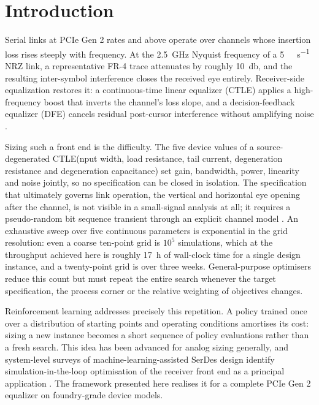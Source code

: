 \documentclass[10pt,a4paper]{article}
\begin{document}
\vspace{2mm}

\section{Introduction}

Serial links at PCIe Gen 2 rates and above operate over channels whose insertion
loss rises steeply with frequency. At the \SI{2.5}{\giga\hertz} Nyquist frequency
of a \SI{5}{\giga\bit\per\second} NRZ link, a representative FR-4 trace
attenuates by roughly \SI{10}{\decibel}, and the resulting inter-symbol
interference closes the received eye entirely. Receiver-side equalization
restores it: a continuous-time linear equalizer (CTLE) applies a
high-frequency boost that inverts the channel's loss slope, and a
decision-feedback equalizer (DFE) cancels residual post-cursor interference
without amplifying noise \cite{saif2021,shibasaki2015}.

Sizing such a front end is the difficulty. The five device values of a
source-degenerated CTLE(nput width, load resistance, tail current,
degeneration resistance and degeneration capacitance) set gain, bandwidth,
power, linearity and noise jointly, so no specification can be closed in
isolation. The specification that ultimately governs link operation, the vertical
and horizontal eye opening after the channel, is not visible in a small-signal
analysis at all; it requires a pseudo-random bit sequence transient through an
explicit channel model \cite{naidu2022}. An exhaustive sweep over five continuous
parameters is exponential in the grid resolution: even a coarse ten-point grid is
$10^5$ simulations, which at the throughput achieved here is roughly
\SI{17}{\hour} of wall-clock time for a single design instance, and a
twenty-point grid is over three weeks. General-purpose optimisers reduce this
count but must repeat the entire search whenever the target specification, the
process corner or the relative weighting of objectives changes.

Reinforcement learning addresses precisely this repetition. A policy trained once
over a distribution of starting points and operating conditions amortises its
cost: sizing a new instance becomes a short sequence of policy evaluations rather
than a fresh search. This idea has been advanced for analog sizing generally, and
system-level surveys of machine-learning-assisted SerDes design identify
simulation-in-the-loop optimisation of the receiver front end as a principal
application \cite{song2019}. The framework presented here realises it for a
complete PCIe Gen 2 equalizer on foundry-grade device models.
\end{document}
